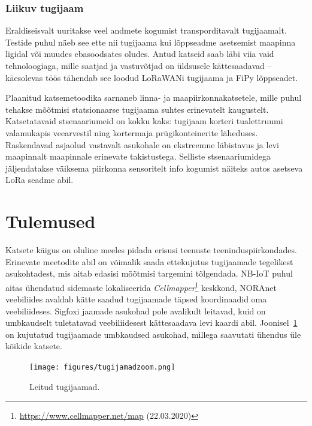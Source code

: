 \documentclass[12pt]{article}
\begin{document}
    \subsubsection{Liikuv tugijaam}

    Eraldiseisvalt uuritakse veel andmete kogumist transporditavalt tugijaamalt.
    Testide puhul näeb see ette nii tugijaama kui lõppseadme asetsemist maapinna ligidal või muudes ebasoodsates oludes.
    Antud katseid saab läbi viia vaid tehnoloogiaga, mille saatjad ja vastuvõtjad on üldsusele kättesaadavad -- käesolevas töös tähendab see loodud LoRaWANi tugijaama ja FiPy lõppseadet.

    Plaanitud katsemetoodika sarnaneb linna- ja maapiirkonnakatsetele, mille puhul tehakse mõõtmisi statsionaarse tugijaama suhtes erinevatelt kaugustelt.
    Katsetatavaid stsenaariumeid on kokku kaks: tugijaam korteri tualettruumi valamukapis veearvestil ning kortermaja prügikonteinerite läheduses.
    Raskendavad asjaolud vastavalt asukohale on ekstreemne läbistavus ja levi maapinnalt maapinnale erinevate takistustega.
    Selliste stsenaariumidega jäljendatakse väiksema piirkonna sensoritelt info kogumist näiteks autos asetseva LoRa seadme abil.

    \newpage

    \section{Tulemused}

    Katsete käigus on oluline meeles pidada erisusi teenuste teeninduspiirkondades.
    Erinevate meetodite abil on võimalik saada ettekujutus tugijaamade tegelikest asukohtadest, mis aitab edasisi mõõtmisi targemini tõlgendada.
    NB-IoT puhul aitas ühendatud sidemaste lokaliseerida \textit{Cellmapper}\footnote{\url{https://www.cellmapper.net/map} (22.03.2020)} keskkond, NORAnet veebiliides avaldab kätte saadud tugijaamade täpsed koordinaadid oma veebiliideses.
    Sigfoxi jaamade asukohad pole avalikult leitavad, kuid on umbkaudselt tuletatavad veebiliidesest kättesaadava levi kaardi abil.
    Joonisel~\ref{fig:tugijaamad} on kujutatud tugijaamade umbkaudsed asukohad, millega saavutati ühendus üle kõikide katsete.

    \begin{figure} [ht]
        \begin{center}
            \texttt{[image: figures/tugijamadzoom.png]}
            \caption{Leitud tugijaamad.}
            \label{fig:tugijaamad}
        \end{center}
    \end{figure}
\end{document}
